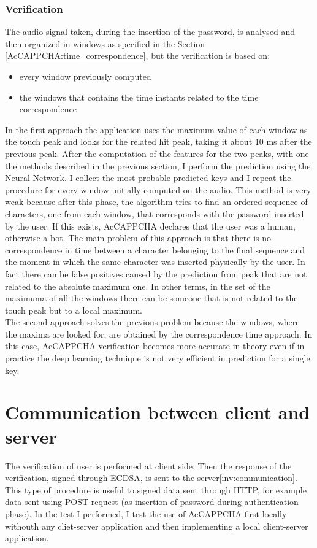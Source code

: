 \subsubsection{Verification}
The audio signal taken, during the insertion of the password, is analysed and then organized in windows as specified in the Section \ref{AcCAPPCHA:time_correspondence}, but the verification is based on:
\begin{itemize}
\item{every window previously computed}
\item{the windows that contains the time instants related to the time correspondence}
\end{itemize}
In the first approach the application uses the maximum value of each window as the touch peak and looks for the related hit peak, taking it about 10 ms after the previous peak. After the computation of the features for the two peaks, with one the methods described in the previous section, I perform the prediction using the Neural Network. I collect the most probable predicted keys and I repeat the procedure for every window initially computed on the audio. This method is very weak because after this phase, the algorithm tries to find an ordered sequence of characters, one from each window, that corresponds with the password inserted by the user. If this exists, AcCAPPCHA declares that the user was a human, otherwise a bot. The main problem of this approach is that there is no correspondence in time between a character belonging to the final sequence and the moment in which the same character was inserted physically by the user. In fact there can be false positives caused by the prediction from peak that are not related to the absolute maximum one. In other terms, in the set of the maximuma of all the windows there can be someone that is not related to the touch peak but to a local maximum.\\
The second approach solves the previous problem because the windows, where the maxima are looked for, are obtained by the correspondence time approach. In this case, AcCAPPCHA verification becomes more accurate in theory even if in practice the deep learning technique is not very efficient in prediction for a single key.

\section{Communication between client and server}
The verification of user is performed at client side. Then the response of the verification, signed through ECDSA, is sent to the server\ref{inv:communication}. This type of procedure is useful to signed data sent through HTTP, for example data sent using POST request (as insertion of password during authentication phase). In the test I performed, I test the use of AcCAPPCHA first locally withouth any cliet-server application and then implementing a local client-server application.\\
